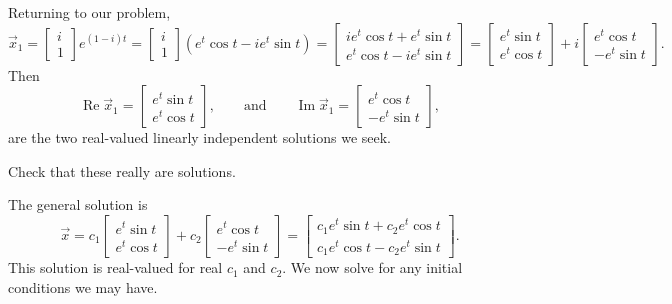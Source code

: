 Returning to our problem,
\begin{equation*}
\vec{x}_1 =
\begin{bmatrix} i \\ 1 \end{bmatrix} e^{(1-i)t}
=
\begin{bmatrix} i \\ 1 \end{bmatrix} \left( e^t \cos t - i e^t \sin t \right)
=
\begin{bmatrix}
i e^t \cos t + e^t \sin t  \\
e^t \cos t - i e^t \sin t
\end{bmatrix}
=
\begin{bmatrix}
e^t \sin t  \\
e^t \cos t
\end{bmatrix}
+ i
\begin{bmatrix}
e^t \cos t  \\
- e^t \sin t
\end{bmatrix}
.
\end{equation*}
Then
\begin{equation*}
\operatorname{Re} \vec{x}_1 = 
\begin{bmatrix}
e^t \sin t  \\
e^t \cos t
\end{bmatrix} ,
\qquad \text{and} \qquad
\operatorname{Im} \vec{x}_1 = 
\begin{bmatrix}
e^t \cos t \\
- e^t \sin t
\end{bmatrix} ,
\end{equation*}
are the two real-valued linearly independent solutions we seek.

\begin{exercise}
Check that these really are solutions.
\end{exercise}

The general solution is
\begin{equation*}
\vec{x}
=
c_1
\begin{bmatrix}
e^t \sin t  \\
e^t \cos t
\end{bmatrix} 
+ c_2
\begin{bmatrix}
e^t \cos t \\
-e^t \sin t
\end{bmatrix} 
=
\begin{bmatrix}
c_1 e^t \sin t + c_2 e^t \cos t \\
c_1 e^t \cos t - c_2 e^t \sin t
\end{bmatrix} .
\end{equation*}
This solution is real-valued for real $c_1$ and $c_2$.  We now solve
for any initial conditions we may have.


